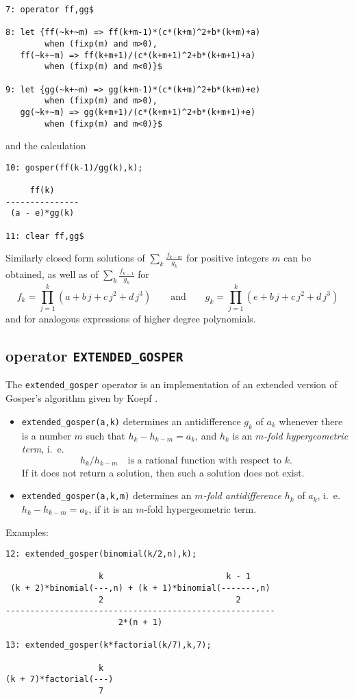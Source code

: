 {\small
\begin{verbatim}
7: operator ff,gg$

8: let {ff(~k+~m) => ff(k+m-1)*(c*(k+m)^2+b*(k+m)+a) 
        when (fixp(m) and m>0),
   ff(~k+~m) => ff(k+m+1)/(c*(k+m+1)^2+b*(k+m+1)+a) 
        when (fixp(m) and m<0)}$

9: let {gg(~k+~m) => gg(k+m-1)*(c*(k+m)^2+b*(k+m)+e) 
        when (fixp(m) and m>0),
   gg(~k+~m) => gg(k+m+1)/(c*(k+m+1)^2+b*(k+m+1)+e) 
        when (fixp(m) and m<0)}$
\end{verbatim}
}\noindent
and the calculation

{\small
\begin{verbatim}
10: gosper(ff(k-1)/gg(k),k);

     ff(k)
---------------
 (a - e)*gg(k)

11: clear ff,gg$
\end{verbatim}
}\noindent
Similarly closed form solutions of $\sum\nolimits_k\frac{f_{k-m}}{g_{k}}$
for positive integers $m$ can be obtained, as well as of
$\sum_k\frac{f_{k-1}}{g_{k}}$ for
\[
f_k=\prod_{j=1}^k (a+b\,j+c\,j^2+d\,j^3)
\quad\quad\mbox{and}\quad\quad
g_k=\prod_{j=1}^k (e+b\,j+c\,j^2+d\,j^3)
\]
and for analogous expressions of higher degree polynomials.

\subsection{\REDUCE{} operator {\tt EXTENDED\_GOSPER}}

The {\tt extended\verb+_+gosper} operator is an implementation of an extended
version of Gosper's algorithm given by Koepf \cite{Koepf}.
\begin{itemize}
\item
{\tt extended\verb+_+gosper(a,k)} determines an antidifference $g_k$ of $a_k$
whenever there is a number $m$ such that $h_{k}-h_{k-m}=a_k$, and $h_k$ is an
{\sl $m$-fold hypergeometric term}, i.\ e.
\[
h_{k}/h_{k-m}\quad\mbox{is a rational function with respect to $k$.}
\]
If it does not return a solution, then such a solution does not exist.
\item
{\tt extended\verb+_+gosper(a,k,m)} 
determines an {\sl $m$-fold antidifference} $h_k$ of $a_k$,
i.\ e.\ $h_{k}-h_{k-m}=a_k$, if it is an $m$-fold hypergeometric term.
\end{itemize}
Examples:

{\small
\begin{verbatim}
12: extended_gosper(binomial(k/2,n),k);

                   k                         k - 1
 (k + 2)*binomial(---,n) + (k + 1)*binomial(-------,n)
                   2                           2
-------------------------------------------------------
                       2*(n + 1)

13: extended_gosper(k*factorial(k/7),k,7);

                   k
(k + 7)*factorial(---)
                   7
\end{verbatim}
}\noindent

